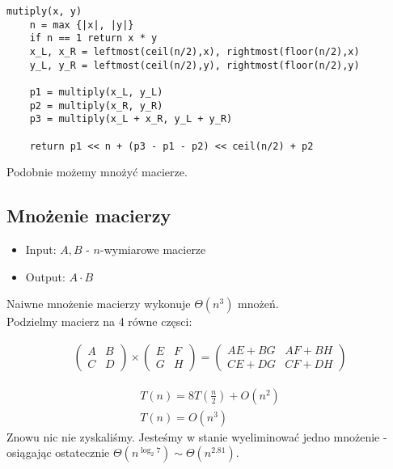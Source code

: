 \documentclass{article}
\begin{document}
\begin{verbatim}
mutiply(x, y)
    n = max {|x|, |y|}
    if n == 1 return x * y
    x_L, x_R = leftmost(ceil(n/2),x), rightmost(floor(n/2),x)
    y_L, y_R = leftmost(ceil(n/2),y), rightmost(floor(n/2),y)

    p1 = multiply(x_L, y_L)
    p2 = multiply(x_R, y_R)
    p3 = multiply(x_L + x_R, y_L + y_R)

    return p1 << n + (p3 - p1 - p2) << ceil(n/2) + p2
\end{verbatim}

\noindent
Podobnie możemy mnożyć macierze.

\subsection{Mnożenie macierzy}

\begin{itemize}
    \item Input: $A, B$ - $n$-wymiarowe macierze
    \item Output: $A \cdot B$
\end{itemize}

Naiwne mnożenie macierzy wykonuje $\Theta(n^3)$ mnożeń.\\

Podzielmy macierz na 4 równe częsci:

\begin{align}
    \begin{pmatrix}
        A & B\\
        C & D
    \end{pmatrix}
    \times
    \begin{pmatrix}
        E & F\\
        G & H
    \end{pmatrix}
    = 
    \begin{pmatrix}
        AE + BG & AF + BH\\
        CE + DG & CF + DH
    \end{pmatrix}
\end{align}

\begin{align}
    T(n) = 8T\left(\frac{n}{2}\right) + O(n^2)\\
    T(n) = O(n^3)
\end{align}
Znowu nic nie zyskaliśmy. Jesteśmy w stanie wyeliminować jedno mnożenie
- osiągając ostatecznie $\Theta(n^{\log_2 7}) \sim \Theta(n^{2.81})$.\\
\end{document}
